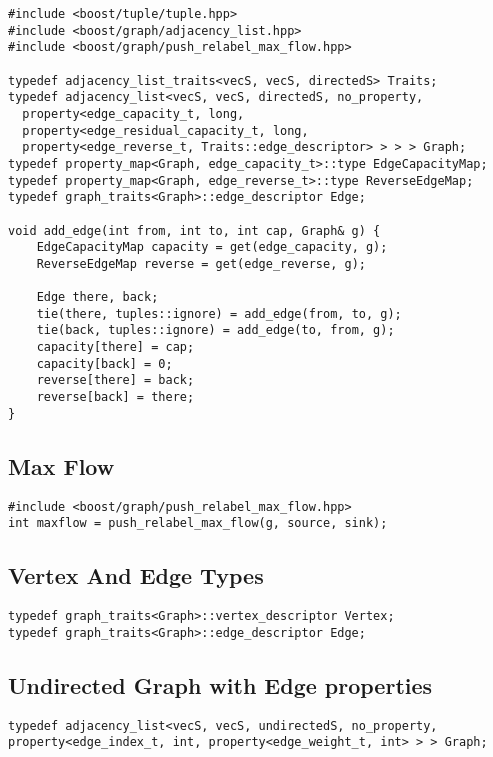 \documentclass[11pt]{article}
\begin{document}
\begin{lstlisting}
#include <boost/tuple/tuple.hpp>
#include <boost/graph/adjacency_list.hpp>
#include <boost/graph/push_relabel_max_flow.hpp>

typedef adjacency_list_traits<vecS, vecS, directedS> Traits;
typedef adjacency_list<vecS, vecS, directedS, no_property,
  property<edge_capacity_t, long,
  property<edge_residual_capacity_t, long,
  property<edge_reverse_t, Traits::edge_descriptor> > > > Graph;
typedef property_map<Graph, edge_capacity_t>::type EdgeCapacityMap;
typedef property_map<Graph, edge_reverse_t>::type ReverseEdgeMap;
typedef graph_traits<Graph>::edge_descriptor Edge;

void add_edge(int from, int to, int cap, Graph& g) {
    EdgeCapacityMap capacity = get(edge_capacity, g);
    ReverseEdgeMap reverse = get(edge_reverse, g);
    
    Edge there, back;
    tie(there, tuples::ignore) = add_edge(from, to, g);
    tie(back, tuples::ignore) = add_edge(to, from, g);
    capacity[there] = cap;
    capacity[back] = 0;
    reverse[there] = back;
    reverse[back] = there;
}
\end{lstlisting}

\subsection{Max Flow}
\begin{lstlisting}
#include <boost/graph/push_relabel_max_flow.hpp>
int maxflow = push_relabel_max_flow(g, source, sink);
\end{lstlisting}

\subsection{Vertex And Edge Types}
\begin{lstlisting}
typedef graph_traits<Graph>::vertex_descriptor Vertex;
typedef graph_traits<Graph>::edge_descriptor Edge;
\end{lstlisting}

\subsection{Undirected Graph with Edge properties}
\begin{lstlisting}
typedef adjacency_list<vecS, vecS, undirectedS, no_property, property<edge_index_t, int, property<edge_weight_t, int> > > Graph;
\end{lstlisting}
\end{document}
